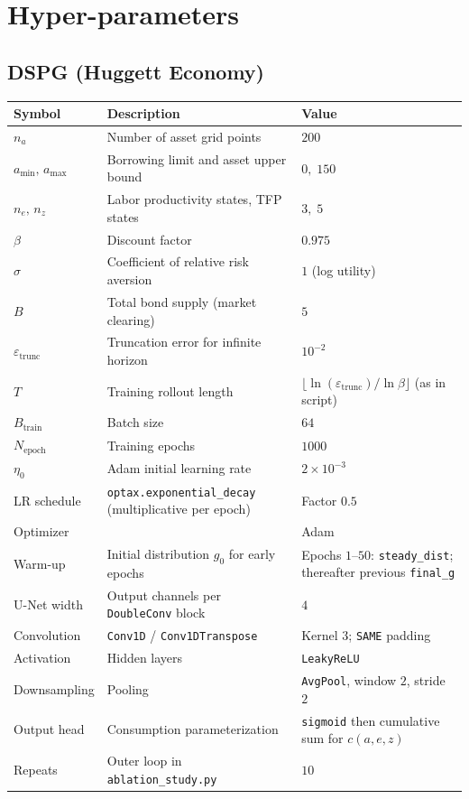 \section{Hyper-parameters}
\label{appendix_hyper_params}

\subsection{DSPG (Huggett Economy)}
\label{appendix_hyper_dspg_huggett}
\begin{table}[H]
  \centering
  \small
  \setlength{\tabcolsep}{6pt}
  \renewcommand{\arraystretch}{1.15}
  \begin{tabular}{@{}p{2.4cm}p{6.2cm}p{4.8cm}@{}}
    \toprule
    Symbol & Description & Value \\
    \midrule
    $n_a$ & Number of asset grid points & $200$ \\
    $a_{\min},\,a_{\max}$ & Borrowing limit and asset upper bound & $0,\;150$ \\
    $n_e,\,n_z$ & Labor productivity states, TFP states & $3,\;5$ \\
    $\beta$ & Discount factor & $0.975$ \\
    $\sigma$ & Coefficient of relative risk aversion & $1$ (log utility) \\
    $B$ & Total bond supply (market clearing) & $5$ \\
    $\varepsilon_{\mathrm{trunc}}$ & Truncation error for infinite horizon & $10^{-2}$ \\
    $T$ & Training rollout length & $\lfloor \ln(\varepsilon_{\mathrm{trunc}})/\ln\beta\rfloor$ (as in script) \\
    $B_{\mathrm{train}}$ & Batch size & $64$ \\
    $N_{\mathrm{epoch}}$ & Training epochs & $1000$ \\
    $\eta_0$ & Adam initial learning rate & $2\times 10^{-3}$ \\
    LR schedule & \texttt{optax.exponential\_decay} (multiplicative per epoch) & Factor $0.5$ \\
    Optimizer & & Adam \\
    Warm-up & Initial distribution $g_0$ for early epochs & Epochs $1$--$50$: \texttt{steady\_dist}; thereafter previous \texttt{final\_g} \\
    U-Net width & Output channels per \texttt{DoubleConv} block & $4$ \\
    Convolution & \texttt{Conv1D} / \texttt{Conv1DTranspose} & Kernel $3$; \texttt{SAME} padding \\
    Activation & Hidden layers & \texttt{LeakyReLU} \\
    Downsampling & Pooling & \texttt{AvgPool}, window $2$, stride $2$ \\
    Output head & Consumption parameterization & \texttt{sigmoid} then cumulative sum for $c(a,e,z)$ \\
    Repeats & Outer loop in \texttt{ablation\_study.py} & $10$ \\
    \bottomrule
  \end{tabular}
\end{table}

